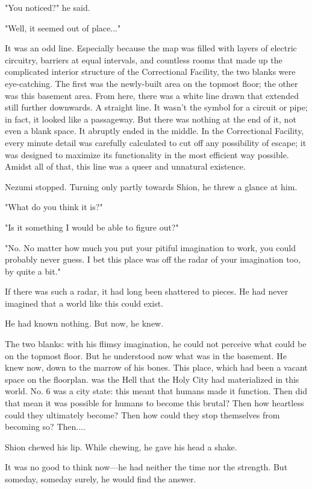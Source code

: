 "You noticed?" he said.

"Well, it seemed out of place..."

It was an odd line. Especially because the map was filled with layers of
electric circuitry, barriers at equal intervals, and countless rooms
that made up the complicated interior structure of the Correctional
Facility, the two blanks were eye-catching. The first was the
newly-built area on the topmost floor; the other was this basement area.
From here, there was a white line drawn that extended still further
downwards. A straight line. It wasn't the symbol for a circuit or pipe;
in fact, it looked like a passageway. But there was nothing at the end
of it, not even a blank space. It abruptly ended in the middle. In the
Correctional Facility, every minute detail was carefully calculated to
cut off any possibility of escape; it was designed to maximize its
functionality in the most efficient way possible. Amidst all of that,
this line was a queer and unnatural existence.

Nezumi stopped. Turning only partly towards Shion, he threw a glance at
him.

"What do you think it is?"

"Is it something I would be able to figure out?"

"No. No matter how much you put your pitiful imagination to work, you
could probably never guess. I bet this place was off the radar of your
imagination too, by quite a bit."

If there was such a radar, it had long been shattered to pieces. He had
never imagined that a world like this could exist.

He had known nothing. But now, he knew.

The two blanks: with his flimsy imagination, he could not perceive what
could be on the topmost floor. But he understood now what was in the
basement. He knew now, down to the marrow of his bones. This place,
which had been a vacant space on the floorplan. was the Hell that the
Holy City had materialized in this world. No. 6 was a city state: this
meant that humans made it function. Then did that mean it was possible
for humans to become this brutal? Then how heartless could they
ultimately become? Then how could they stop themselves from becoming so?
Then....

Shion chewed his lip. While chewing, he gave his head a shake.

It was no good to think now---he had neither the time nor the strength.
But someday, someday surely, he would find the answer.

